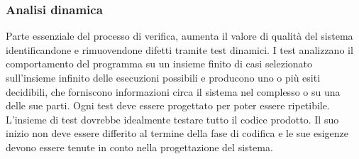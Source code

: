 	
	\subsubsection{Analisi dinamica}
	Parte essenziale del processo di verifica, aumenta il valore di qualit\`{a} del sistema identificandone e rimuovendone difetti tramite test dinamici. I test analizzano il comportamento del programma su un insieme finito di casi selezionato sull'insieme infinito delle esecuzioni possibili e producono uno o pi\`{u} esiti decidibili, che forniscono informazioni circa il sistema nel complesso o su una delle sue parti. Ogni test deve essere progettato per poter essere ripetibile. L'insieme di test dovrebbe idealmente testare tutto il codice prodotto. Il suo inizio non deve essere differito al termine della fase di codifica e le sue esigenze devono essere tenute in conto nella progettazione del sistema.
	
	
	
	
	